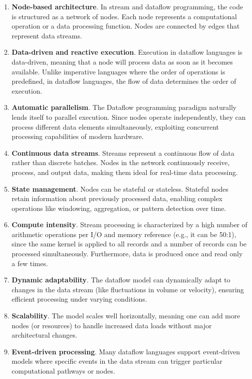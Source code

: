 \documentclass[11pt, reqno]{amsart}
\theoremstyle{definition}
\theoremstyle{remark}
\begin{document}
\begin{enumerate}
  \item \textbf{Node-based architecture}.
        In stream and dataflow programming, the code is structured as a network of
        nodes. Each node represents a computational operation or a data processing
        function. Nodes are connected by edges that represent data streams.

  \item \textbf{Data-driven and reactive execution}.
        Execution in dataflow languages is data-driven, meaning that a node will
        process data as soon as it becomes available. Unlike imperative languages
        where the order of operations is predefined, in dataflow languages, the
        flow of data determines the order of execution.

  \item \textbf{Automatic parallelism}.
        The Dataflow programming paradigm naturally lends itself to parallel
        execution. Since nodes operate independently, they can process different
        data elements simultaneously, exploiting concurrent processing
        capabilities of modern hardware.

  \item \textbf{Continuous data streams}.
        Streams represent a continuous flow of data rather than discrete batches. Nodes
        in the network continuously receive, process, and output data, making them
        ideal for real-time data processing.

  \item \textbf{State management}.
        Nodes can be stateful or stateless. Stateful nodes retain information about
        previously processed data, enabling complex operations like windowing,
        aggregation, or pattern detection over time.

  \item \textbf{Compute intensity}.
        Stream processing is characterized by a high number of arithmetic
        operations per I/O and memory reference (e.g., it can be 50:1), since
        the same kernel is applied to all records and a number of records can be
        processed simultaneously. Furthermore, data is produced once and read only
        a few times.

  \item \textbf{Dynamic adaptability}.
        The dataflow model can dynamically adapt to changes in the data stream
        (like fluctuations in volume or velocity), ensuring efficient processing
        under varying conditions.

  \item \textbf{Scalability}.
        The model scales well horizontally, meaning one can add more nodes (or
        resources) to handle increased data loads without major architectural
        changes.

  \item \textbf{Event-driven processing}.
        Many dataflow languages support event-driven models where specific events
        in the data stream can trigger particular computational pathways or nodes.
\end{enumerate}
\end{document}
